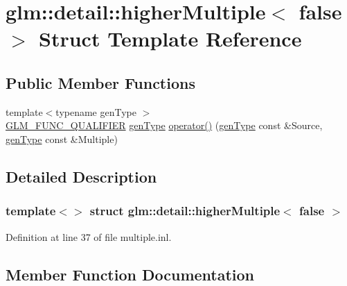 \hypertarget{structglm_1_1detail_1_1higher_multiple_3_01false_01_4}{}\section{glm\+:\+:detail\+:\+:higher\+Multiple$<$ false $>$ Struct Template Reference}
\label{structglm_1_1detail_1_1higher_multiple_3_01false_01_4}
\subsection*{Public Member Functions}
\begin{DoxyCompactItemize}
\item 
{\footnotesize template$<$typename gen\+Type $>$ }\\\hyperlink{setup_8hpp_a33fdea6f91c5f834105f7415e2a64407}{G\+L\+M\+\_\+\+F\+U\+N\+C\+\_\+\+Q\+U\+A\+L\+I\+F\+I\+ER} \hyperlink{structglm_1_1detail_1_1gen_type}{gen\+Type} \hyperlink{structglm_1_1detail_1_1higher_multiple_3_01false_01_4_ae121db4aac2a541989b912b3966bffdb}{operator()} (\hyperlink{structglm_1_1detail_1_1gen_type}{gen\+Type} const \&Source, \hyperlink{structglm_1_1detail_1_1gen_type}{gen\+Type} const \&Multiple)
\end{DoxyCompactItemize}


\subsection{Detailed Description}
\subsubsection*{template$<$$>$\newline
struct glm\+::detail\+::higher\+Multiple$<$ false $>$}



Definition at line 37 of file multiple.\+inl.



\subsection{Member Function Documentation}
\mbox{\label{structglm_1_1detail_1_1higher_multiple_3_01false_01_4_ae121db4aac2a541989b912b3966bffdb}} 
